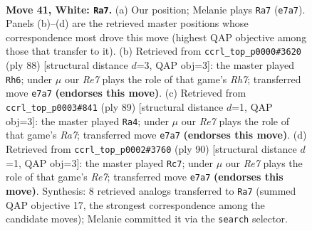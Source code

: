 \documentclass[11pt]{article}
\begin{document}
\clearpage

\begin{figure}[p]\centering
\begin{subfigure}{0.46\textwidth}\centering
\resizebox{\linewidth}{!}{%
\newchessgame
\chessboard[
  setfen={7k/4R3/8/8/p5K1/P7/7r/8 w - - 6 41},
  showmover=false,
  pgfstyle=straightmove, color=movearrow, markmove={e7-a7}
]}
\caption{}
\end{subfigure}\hfill
\begin{subfigure}{0.46\textwidth}\centering
\resizebox{\linewidth}{!}{%
\newchessgame
\chessboard[
  setfen={8/7R/5p2/5P2/r5k1/4K3/8/8 w - - 2 45},
  showmover=false,
  pgfstyle=straightmove, color=movearrow, markmove={h7-h6}
]}
\caption{}
\end{subfigure}
\\[4pt]
\begin{subfigure}{0.46\textwidth}\centering
\resizebox{\linewidth}{!}{%
\newchessgame
\chessboard[
  setfen={8/6R1/8/5p2/7P/5k2/r7/6K1 b - - 0 45},
  showmover=false,
  pgfstyle=straightmove, color=movearrow, markmove={a2-a4}
]}
\caption{}
\end{subfigure}\hfill
\begin{subfigure}{0.46\textwidth}\centering
\resizebox{\linewidth}{!}{%
\newchessgame
\chessboard[
  setfen={6k1/4R3/8/8/8/1Pp2K2/8/6r1 w - - 0 46},
  showmover=false,
  pgfstyle=straightmove, color=movearrow, markmove={e7-c7}
]}
\caption{}
\end{subfigure}
\caption{\textbf{Move 41, White: \texttt{Ra7}.} (a) Our position; Melanie plays \texttt{Ra7} (\texttt{e7a7}). Panels (b)--(d) are the retrieved master positions whose correspondence most drove this move (highest QAP objective among those that transfer to it). (b) Retrieved from \texttt{ccrl\_top\_p0000\#3620} (ply 88) [structural distance $d$=3, QAP obj=3]: the master played \texttt{Rh6}; under $\mu$ our \emph{Re7} plays the role of that game's \emph{Rh7}; transferred move \texttt{e7a7} \textbf{(endorses this move)}. (c) Retrieved from \texttt{ccrl\_top\_p0003\#841} (ply 89) [structural distance $d$=1, QAP obj=3]: the master played \texttt{Ra4}; under $\mu$ our \emph{Re7} plays the role of that game's \emph{Ra7}; transferred move \texttt{e7a7} \textbf{(endorses this move)}. (d) Retrieved from \texttt{ccrl\_top\_p0002\#3760} (ply 90) [structural distance $d$=1, QAP obj=3]: the master played \texttt{Rc7}; under $\mu$ our \emph{Re7} plays the role of that game's \emph{Re7}; transferred move \texttt{e7a7} \textbf{(endorses this move)}. Synthesis: 8 retrieved analogs transferred to \texttt{Ra7} (summed QAP objective 17, the strongest correspondence among the candidate moves); Melanie committed it via the \texttt{search} selector.}
\label{fig:thought-m80}
\end{figure}
\end{document}
